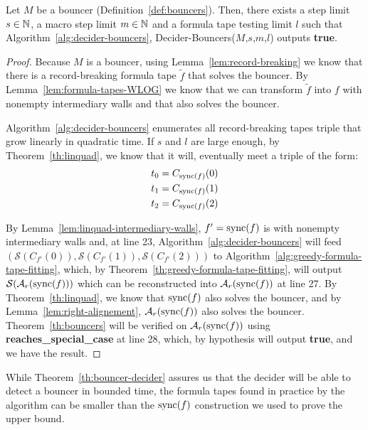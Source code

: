 \begin{theorem}\label{th:bouncer-decider}
    Let $M$ be a bouncer (Definition~\ref{def:bouncers}). Then, there exists a step limit $s\in\mathbb{N}$, a macro step limit $m\in\mathbb{N}$ and a formula tape testing limit $l$ such that Algorithm~\ref{alg:decider-bouncers}, {\sc Decider-Bouncers}($M$,$s$,$m$,$l$) outputs \textbf{true}.
\end{theorem}
\begin{proof}
    Because $M$ is a bouncer, using Lemma~\ref{lem:record-breaking} we know that there is a record-breaking formula tape $\tilde{f}$ that solves the bouncer. By Lemma~\ref{lem:formula-tapes-WLOG} we know that we can transform $\tilde{f}$ into $f$ with nonempty intermediary walls and that also solves the bouncer.

    Algorithm~\ref{alg:decider-bouncers} enumerates all record-breaking tapes triple that grow linearly in quadratic time. If $s$ and $l$ are large enough, by Theorem~\ref{th:linquad}, we know that it will, eventually meet a triple of the form: \begin{align*}
        t_0 & = C_{\operatorname{sync}(f)}(0) \\
        t_1 & = C_{\operatorname{sync}(f)}(1) \\
        t_2 & = C_{\operatorname{sync}(f)}(2)
    \end{align*}

    By Lemma~\ref{lem:linquad-intermediary-walls}, $f'=\operatorname{sync}(f)$ is with nonempty intermediary walls and, at line 23, Algorithm~\ref{alg:decider-bouncers} will feed $(\mathcal{S}(C_{f'}(0)),\mathcal{S}(C_{f'}(1)),\mathcal{S}(C_{f'}(2)))$ to Algorithm~\ref{alg:greedy-formula-tape-fitting}, which, by Theorem~\ref{th:greedy-formula-tape-fitting}, will output $\mathcal{S}(\mathcal{A}_r(\operatorname{sync}(f)))$ which can be reconstructed into $\mathcal{A}_r(\operatorname{sync}(f))$ at line 27. By Theorem~\ref{th:linquad}, we know that $\operatorname{sync}(f)$ also solves the bouncer, and by Lemma~\ref{lem:right-alignement}, $\mathcal{A}_r(\operatorname{sync}(f))$ also solves the bouncer. Theorem~\ref{th:bouncers} will be verified on $\mathcal{A}_r(\operatorname{sync}(f))$ using \textbf{reaches\_special\_case} at line 28, which, by hypothesis will output \textbf{true}, and we have the result.
\end{proof}

\begin{remark}
    While Theorem~\ref{th:bouncer-decider} assures us that the decider will be able to detect a bouncer in bounded time, the formula tapes found in practice by the algorithm can be smaller than the $\operatorname{sync}(f)$ construction we used to prove the upper bound.
\end{remark}

